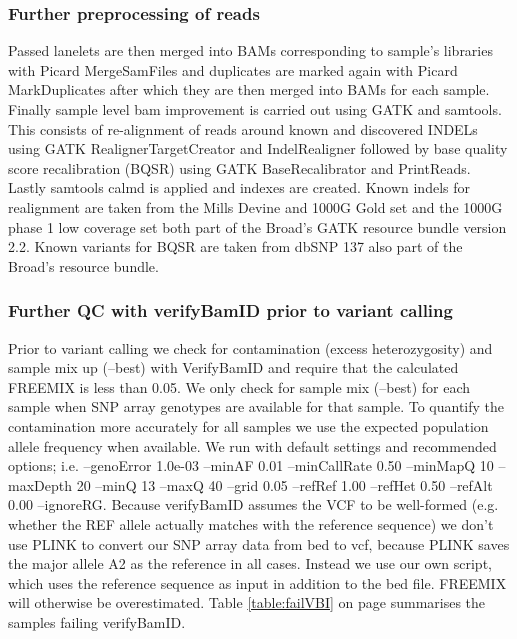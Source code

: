 \subsubsection{Further preprocessing of reads}
Passed lanelets are then merged into BAMs corresponding to sample’s libraries with Picard MergeSamFiles and duplicates are marked again with Picard MarkDuplicates after which they are then merged into BAMs for each sample. Finally sample level bam improvement is carried out using GATK\cite{McKenna01092010}\cite{DePristo2011} and samtools\cite{Li15082009}. This consists of re-alignment of reads around known and discovered INDELs using GATK RealignerTargetCreator and IndelRealigner followed by base quality score recalibration (BQSR) using GATK BaseRecalibrator and PrintReads. Lastly samtools calmd is applied and indexes are created. Known indels for realignment are taken from the Mills Devine and 1000G Gold set and the 1000G phase 1 low coverage set both part of the Broad’s GATK resource bundle version 2.2. Known variants for BQSR are taken from dbSNP 137 also part of the Broad’s resource bundle.

\subsubsection{Further QC with verifyBamID prior to variant calling}

Prior to variant calling we check for contamination (excess heterozygosity) and sample mix up (--best) with VerifyBamID\cite{Jun2012839} and require that the calculated FREEMIX is less than 0.05. We only check for sample mix (--best) for each sample when SNP array genotypes are available for that sample. To quantify the contamination more accurately for all samples we use the expected population allele frequency when available. We run with default settings and recommended options; i.e. --genoError 1.0e-03 --minAF 0.01 --minCallRate 0.50 --minMapQ 10 --maxDepth 20 --minQ 13 --maxQ 40 --grid 0.05 --refRef 1.00 --refHet 0.50 --refAlt 0.00 --ignoreRG. Because verifyBamID assumes the VCF to be well-formed (e.g. whether the REF allele actually matches with the reference sequence) we don't use PLINK to convert our SNP array data from bed to vcf, because PLINK saves the major allele A2 as the reference in all cases. Instead we use our own script, which uses the reference sequence as input in addition to the bed file. FREEMIX will otherwise be overestimated.
Table \ref{table:failVBI} on page \pageref{table:failVBI} summarises the samples failing verifyBamID.

